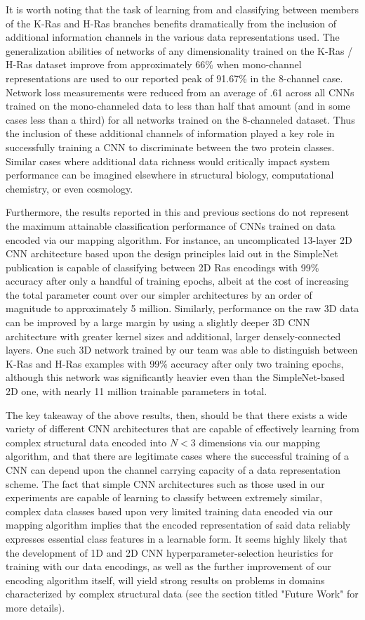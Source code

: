 \documentclass{article}
\begin{document}
It is worth noting that the task of learning from and classifying between members of the K-Ras and H-Ras branches benefits dramatically from the inclusion of additional information channels in the various data representations used. The generalization abilities of networks of any dimensionality trained on the K-Ras / H-Ras dataset improve from approximately 66\% when mono-channel representations are used to our reported peak of 91.67\% in the 8-channel case. Network loss measurements were reduced from an average of .61 across all CNNs trained on the mono-channeled data to less than half that amount (and in some cases less than a third) for all networks trained on the 8-channeled dataset. Thus the inclusion of these additional channels of information played a key role in successfully training a CNN to discriminate between the two protein classes. Similar cases where additional data richness would critically impact system performance can be imagined elsewhere in structural biology, computational chemistry, or even cosmology.

Furthermore, the results reported in this and previous sections do not represent the maximum attainable classification performance of CNNs trained on data encoded via our mapping algorithm. For instance, an uncomplicated 13-layer 2D CNN architecture based upon the design principles laid out in the SimpleNet publication \cite{DBLP:journals/corr/HasanPourRVS16} is capable of classifying between 2D Ras encodings with 99\% accuracy after only a handful of training epochs, albeit at the cost of increasing the total parameter count over our simpler architectures by an order of magnitude to approximately 5 million. Similarly, performance on the raw 3D data can be improved by a large margin by using a slightly deeper 3D CNN architecture with greater kernel sizes and additional, larger densely-connected layers. One such 3D network trained by our team was able to distinguish between K-Ras and H-Ras examples with 99\% accuracy after only two training epochs, although this network was significantly heavier even than the SimpleNet-based 2D one, with nearly 11 million trainable parameters in total.

The key takeaway of the above results, then, should be that there exists a wide variety of different CNN architectures that are capable of effectively learning from complex structural data encoded into $N<3$ dimensions via our mapping algorithm, and that there are legitimate cases where the successful training of a CNN can depend upon the channel carrying capacity of a data representation scheme. The fact that simple CNN architectures such as those used in our experiments are capable of learning to classify between extremely similar, complex data classes based upon very limited training data encoded via our mapping algorithm implies that the encoded representation of said data reliably expresses essential class features in a learnable form. It seems highly likely that the development of 1D and 2D CNN hyperparameter-selection heuristics for training with our data encodings, as well as the further improvement of our encoding algorithm itself, will yield strong results on problems in domains characterized by complex structural data (see the section titled "Future Work" for more details). 
\end{document}
